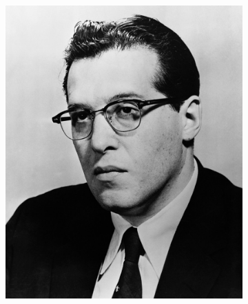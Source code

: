 	\begin{figure}
			\begin{subfigure}{0.5\textwidth}
	\centering	
		\includegraphics[scale=0.15]{images/schwinger.jpg}
	\end{subfigure}
	\begin{subfigure}{0.5\textwidth}
	\centering	

\end{subfigure}
\end{figure}
